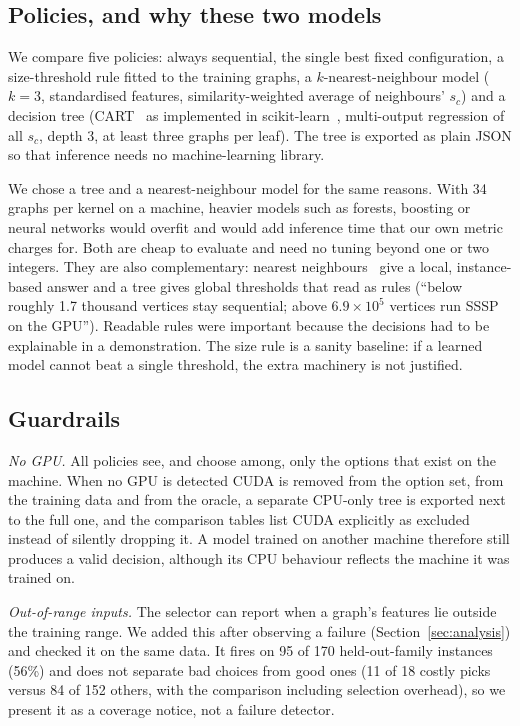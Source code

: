 \documentclass[conference]{IEEEtran}
\begin{document}
\subsection{Policies, and why these two models}
We compare five policies: always sequential, the single best fixed configuration, a size-threshold rule fitted to the training graphs, a $k$-nearest-neighbour model ($k{=}3$, standardised features, similarity-weighted average of neighbours' $s_c$) and a decision tree (CART~\cite{cart} as implemented in scikit-learn~\cite{sklearn}, multi-output regression of all $s_c$, depth 3, at least three graphs per leaf). The tree is exported as plain JSON so that inference needs no machine-learning library.

We chose a tree and a nearest-neighbour model for the same reasons. With 34 graphs per kernel on a machine, heavier models such as forests, boosting or neural networks would overfit and would add inference time that our own metric charges for. Both are cheap to evaluate and need no tuning beyond one or two integers. They are also complementary: nearest neighbours~\cite{knn} give a local, instance-based answer and a tree gives global thresholds that read as rules (``below roughly 1.7 thousand vertices stay sequential; above $6.9\times10^{5}$ vertices run SSSP on the GPU''). Readable rules were important because the decisions had to be explainable in a demonstration. The size rule is a sanity baseline: if a learned model cannot beat a single threshold, the extra machinery is not justified.

\subsection{Guardrails}
\textit{No GPU.} All policies see, and choose among, only the options that exist on the machine. When no GPU is detected CUDA is removed from the option set, from the training data and from the oracle, a separate CPU-only tree is exported next to the full one, and the comparison tables list CUDA explicitly as excluded instead of silently dropping it. A model trained on another machine therefore still produces a valid decision, although its CPU behaviour reflects the machine it was trained on.

\textit{Out-of-range inputs.} %
The selector can report when a graph's features lie outside the training range. We added this after observing a failure (Section~\ref{sec:analysis}) and checked it on the same data. It fires on 95 of 170 held-out-family instances (56\%) and does not separate bad choices from good ones (11 of 18 costly picks versus 84 of 152 others, with the comparison including selection overhead), so we present it as a coverage notice, not a failure detector.
\end{document}
